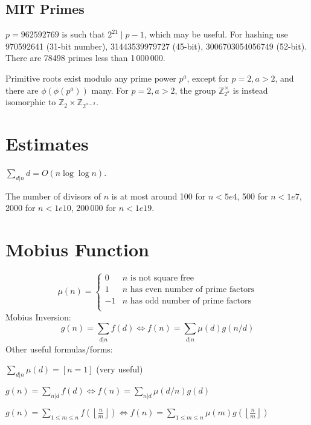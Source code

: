 
\subsection{MIT Primes}
	$p=962592769$ is such that $2^{21} \mid p-1$, which may be useful. For hashing
	use 970592641 (31-bit number), 31443539979727 (45-bit), 3006703054056749
	(52-bit). There are 78498 primes less than 1\,000\,000.

	Primitive roots exist modulo any prime power $p^a$, except for $p = 2, a > 2$, and there are $\phi(\phi(p^a))$ many.
	For $p = 2, a > 2$, the group $\mathbb Z_{2^a}^\times$ is instead isomorphic to $\mathbb Z_2 \times \mathbb Z_{2^{a-2}}$.

\section{Estimates}
	$\sum_{d|n} d = O(n \log \log n)$.

	The number of divisors of $n$ is at most around 100 for $n < 5e4$, 500 for $n < 1e7$, 2000 for $n < 1e10$, 200\,000 for $n < 1e19$.

\section{Mobius Function}
\[
	\mu(n) = \begin{cases} 0 & n \textrm{ is not square free}\\ 1 & n \textrm{ has even number of prime factors}\\ -1 & n \textrm{ has odd number of prime factors}\\\end{cases}
\]
  Mobius Inversion:
  \[ g(n) = \sum_{d|n} f(d) \Leftrightarrow f(n) = \sum_{d|n} \mu(d)g(n/d) \]
  Other useful formulas/forms:

  $ \sum_{d | n} \mu(d) = [ n = 1] $ (very useful)

  $ g(n) = \sum_{n|d} f(d) \Leftrightarrow f(n) = \sum_{n|d} \mu(d/n)g(d)$

 $ g(n) = \sum_{1 \leq m \leq n} f(\left\lfloor\frac{n}{m}\right \rfloor ) \Leftrightarrow f(n) = \sum_{1\leq m\leq n} \mu(m)g(\left\lfloor\frac{n}{m}\right\rfloor)$
